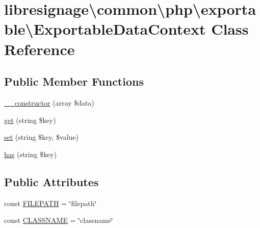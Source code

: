 \hypertarget{classlibresignage_1_1common_1_1php_1_1exportable_1_1ExportableDataContext}{}\section{libresignage\textbackslash{}common\textbackslash{}php\textbackslash{}exportable\textbackslash{}Exportable\+Data\+Context Class Reference}
\label{classlibresignage_1_1common_1_1php_1_1exportable_1_1ExportableDataContext}
\subsection*{Public Member Functions}
\begin{DoxyCompactItemize}
\item 
\hyperlink{classlibresignage_1_1common_1_1php_1_1exportable_1_1ExportableDataContext_a19f02e6ac177d88d313f388a82db2df3}{\+\_\+\+\_\+constructor} (array \$data)
\item 
\hyperlink{classlibresignage_1_1common_1_1php_1_1exportable_1_1ExportableDataContext_a38c572b173f9b9ed53e48ddc7a1eb70a}{get} (string \$key)
\item 
\hyperlink{classlibresignage_1_1common_1_1php_1_1exportable_1_1ExportableDataContext_aecc49609a24efb8feb2931a9d07f8993}{set} (string \$key, \$value)
\item 
\hyperlink{classlibresignage_1_1common_1_1php_1_1exportable_1_1ExportableDataContext_a71ca50bc02fe6ba3451987bea83fd0fa}{has} (string \$key)
\end{DoxyCompactItemize}
\subsection*{Public Attributes}
\begin{DoxyCompactItemize}
\item 
const \hyperlink{classlibresignage_1_1common_1_1php_1_1exportable_1_1ExportableDataContext_a70c4e4600d473d2993ff6ab7d0d23571}{F\+I\+L\+E\+P\+A\+TH} = \char`\"{}filepath\char`\"{}
\item 
const \hyperlink{classlibresignage_1_1common_1_1php_1_1exportable_1_1ExportableDataContext_a4f3e7c4630daaa4add2a44ae56fca948}{C\+L\+A\+S\+S\+N\+A\+ME} = \char`\"{}classname\char`\"{}
\end{DoxyCompactItemize}



